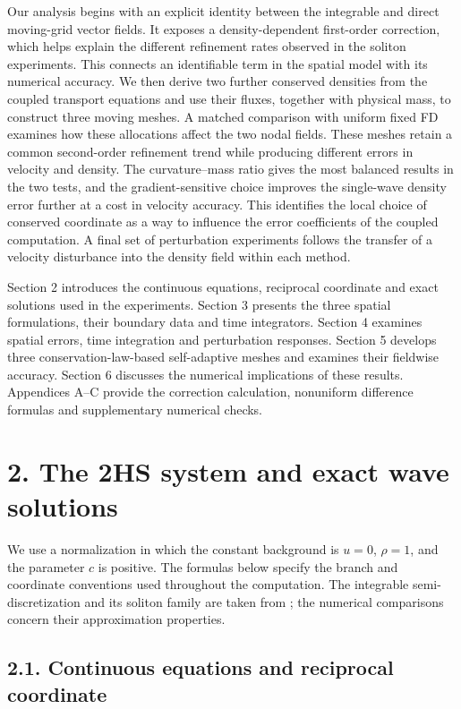 \documentclass[11pt,a4paper]{article}
\begin{document}
Our analysis begins with an explicit identity between the integrable and direct moving-grid vector fields. It exposes a density-dependent first-order correction, which helps explain the different refinement rates observed in the soliton experiments. This connects an identifiable term in the spatial model with its numerical accuracy. We then derive two further conserved densities from the coupled transport equations and use their fluxes, together with physical mass, to construct three moving meshes. A matched comparison with uniform fixed FD examines how these allocations affect the two nodal fields. These meshes retain a common second-order refinement trend while producing different errors in velocity and density. The curvature--mass ratio gives the most balanced results in the two tests, and the gradient-sensitive choice improves the single-wave density error further at a cost in velocity accuracy. This identifies the local choice of conserved coordinate as a way to influence the error coefficients of the coupled computation. A final set of perturbation experiments follows the transfer of a velocity disturbance into the density field within each method.

Section 2 introduces the continuous equations, reciprocal coordinate and exact solutions used in the experiments. Section 3 presents the three spatial formulations, their boundary data and time integrators. Section 4 examines spatial errors, time integration and perturbation responses. Section 5 develops three conservation-law-based self-adaptive meshes and examines their fieldwise accuracy. Section 6 discusses the numerical implications of these results. Appendices A--C provide the correction calculation, nonuniform difference formulas and supplementary numerical checks.

\FloatBarrier
\section*{2. The 2HS system and exact wave solutions}

We use a normalization in which the constant background is \(u=0\), \(\rho=1\), and the parameter \(c\) is positive. The formulas below specify the branch and coordinate conventions used throughout the computation. The integrable semi-discretization and its soliton family are taken from \cite{hori2026}; the numerical comparisons concern their approximation properties.

\FloatBarrier
\subsection*{2.1. Continuous equations and reciprocal coordinate}
\end{document}
